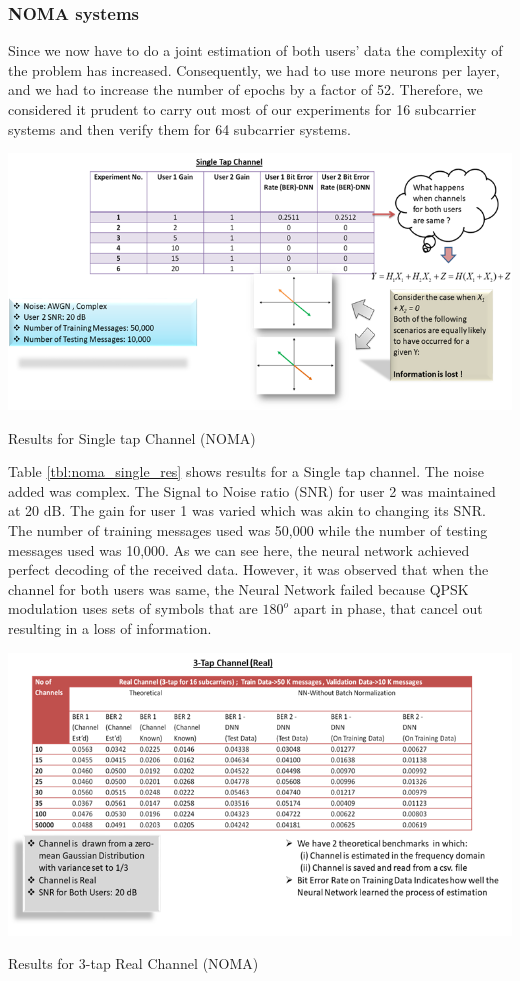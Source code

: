 \subsubsection{NOMA systems}
Since we now have to do a joint estimation of both users’ data the complexity of the problem has increased. Consequently, we had to use more neurons per layer, and we had to increase the number of epochs by a factor of 52. Therefore, we considered it prudent to carry out most of our experiments for 16 subcarrier systems and then verify them for 64 subcarrier systems.\\
\begin{table}[htbp]
  \centering
  \includegraphics[width=\textwidth]{./Figures/noma_single_res.png}
  \caption{Results for Single tap Channel (NOMA)}
  \label{tbl:noma_single_res}
\end{table}
Table \ref{tbl:noma_single_res} shows results for a Single tap channel. The noise added was complex. The Signal to Noise ratio (SNR) for user 2 was maintained at 20 dB. The gain for user 1 was varied which was akin to changing its SNR. The number of training messages used was 50,000 while the number of testing messages used was 10,000. As we can see here, the neural network achieved perfect decoding of the received data. However, it was observed that when the channel for both users was same, the Neural Network failed because QPSK modulation uses sets of symbols that are $180^o$ apart in phase, that cancel out resulting in a loss of information.\\
\begin{table}[htbp]
  \centering
  \includegraphics[width=\textwidth]{./Figures/noma_3tap_res.png}
  \caption{Results for 3-tap Real Channel (NOMA)}
  \label{tbl:noma_3tap_res}
\end{table}

